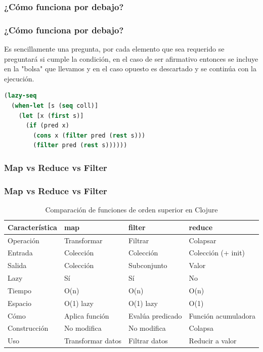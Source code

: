 \documentclass{beamer}
\begin{document}
\subsubsection{¿Cómo funciona por debajo?}
    
\begin{frame}[fragile]
\frametitle{¿Cómo funciona por debajo?}
Es sencillamente una pregunta, por cada elemento que sea requerido se preguntará si cumple 
la condición, en el caso de ser afirmativo entonces se incluye en la "bolsa" que llevamos
y en el caso opuesto es descartado y se continúa con la ejecución.
\begin{lstlisting}[language=Clojure]
(lazy-seq
  (when-let [s (seq coll)]
    (let [x (first s)]
      (if (pred x)
        (cons x (filter pred (rest s)))
        (filter pred (rest s))))))
\end{lstlisting}

\end{frame}

\subsubsection{Map vs Reduce vs Filter }
\begin{frame}[fragile]
\frametitle{Map vs Reduce vs Filter}
\begin{table}[h!]
\centering
\scriptsize  %
\begin{tabular}{|l|l|l|l|}
\hline
\textbf{Característica} & \textbf{map} & \textbf{filter} & \textbf{reduce} \\ \hline
Operación & Transformar & Filtrar & Colapsar \\ \hline
Entrada & Colección & Colección & Colección (+ init) \\ \hline
Salida & Colección & Subconjunto & Valor \\ \hline
Lazy & Sí & Sí & No \\ \hline
Tiempo & O(n) & O(n) & O(n) \\ \hline
Espacio & O(1) lazy & O(1) lazy & O(1) \\ \hline
Cómo & Aplica función & Evalúa predicado & Función acumuladora \\ \hline
Construcción & No modifica & No modifica & Colapsa \\ \hline
Uso & Transformar datos & Filtrar datos & Reducir a valor \\ \hline
\end{tabular}
\caption{Comparación de funciones de orden superior en Clojure}
\label{tab:map-filter-reduce}
\end{table}
\end{frame}
\end{document}
